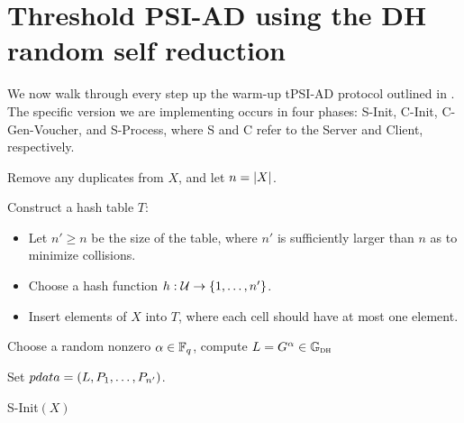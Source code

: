 
\section{Threshold PSI-AD using the DH random self reduction} %
\label{sec:threshold_psi_ad_using_the_dh_random_self_reduction}

We now walk through every step up the warm-up tPSI-AD protocol outlined in \cite{bhowmick2021apple}. The specific version we are implementing occurs in four phases: {\sf S-Init}, {\sf C-Init}, {\sf C-Gen-Voucher}, and {\sf S-Process}, where {\sf S} and {\sf C} refer to the Server and Client, respectively.

\begin{algorithm}[H]
\DontPrintSemicolon
  Remove any duplicates from $X$, and let $n = \left\lvert X\right\rvert$.

     Construct a hash table $T$:\;
    {\begin{itemize}
          \item Let $n' \geq n$ be the size of the table, where  $n'$ is sufficiently larger than $n$ as to minimize collisions.
          \item Choose a hash function $h : \mathcal{U} \to \left\{1,\dots,n'\right\}$.
          \item Insert elements of $X$ into $T$, where each cell should have at most one element.
        \end{itemize}}
   Choose a random nonzero $\alpha \in \mathbb{F}_q$, compute $L = G^\alpha \in \mathbb{G}_{\textsc{dh}}$\;
     

    Set $pdata = \left(L, P_1, \dots, P_{n'}\right)$.


\caption{ {\sf S-Init}$(X)$}
\label{algo:s_init}
\end{algorithm}



  
  
